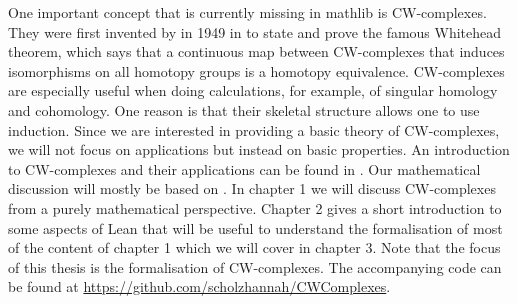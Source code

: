 One important concept that is currently missing in mathlib is CW-complexes. 
They were first invented by  in 1949 in \cite{Whitehead2018} to state and prove the famous Whitehead theorem, which says that a continuous map between CW-complexes that induces isomorphisms on all homotopy groups is a homotopy equivalence.
CW-complexes are especially useful when doing calculations, for example, of singular homology and cohomology. 
One reason is that their skeletal structure allows one to use induction.
Since we are interested in providing a basic theory of CW-complexes, we will not focus on applications but instead on basic properties. 
An introduction to CW-complexes and their applications can be found in \cite{Lundell1969}.
Our mathematical discussion will mostly be based on \cite{Hatcher2001}.
In chapter 1 we will discuss CW-complexes from a purely mathematical perspective. 
Chapter 2 gives a short introduction to some aspects of Lean that will be useful to understand the formalisation of most of the content of chapter 1 which we will cover in chapter 3. 
Note that the focus of this thesis is the formalisation of CW-complexes. 
The accompanying code can be found at \url{https://github.com/scholzhannah/CWComplexes}.